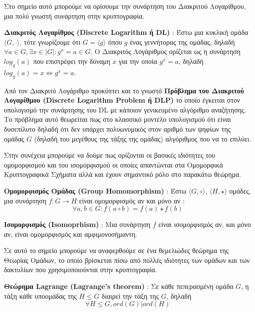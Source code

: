 Στο σημείο αυτό μπορούμε να ορίσουμε την συνάρτηση του Διακριτού Λογαρίθμου, μια πολύ γνωστή συνάρτηση στην κρυπτογραφία.

\begin{definition}
\textbf{Διακριτός Λογαρίθμος (Discrete Logarithm ή DL)} : Έστω μια κυκλική ομάδα $\langle G, \cdot \rangle$, τότε γνωρίζουμε ότι $G = \langle g \rangle$ όπου $g$ ένας γεννήτορας της ομάδας, δηλαδή  $\forall a \in G,  \exists x \in |G|: g^x=a \in G$. Ο Διακριτός Λογάριθμος ορίζεται ως η συνάρτηση $log_g(a)$ που επιστρέφει την δύναμη $x$ για την οποία $g^x=a$, δηλαδή $log_g(a)=x \Leftrightarrow g^x=a$.
\end{definition}

Από τον Διακριτό Λογάριθμο προκύπτει και το γνωστό \textbf{Πρόβλημα του Διακριτού Λογαρίθμου (Discrete Logarithm Problem ή DLP)} το οποίο έγκειται στον υπολογισμό την συνάρτησης του DL με κάποιον γενικευμένο αλγόριθμο αναζήτησης. Το πρόβλημα αυτό θεωρείται πως στο κλασσικό μοντέλο υπολογισμού ότι είναι δυσεπίλυτο δηλαδή ότι δεν υπάρχει πολυωνυμικός στον αριθμό των ψηφίων της ομάδας $G$ (δηλαδή του μεγέθους της τάξης της ομάδας) αλγόριθμος που να το επιλύει.

Στην συνέχεια μπορούμε να δούμε πως ορίζονται οι βασικές ιδιότητες του ομομορφισμού και του ισομορφισμού οι οποίες απαντώνται στα Ομομορφικά Κρυπτογραφικά Σχήματα αλλά και έχουν σημαντικό ρόλο στο παρακάτω θεώρημα.

\begin{definition}
\textbf{Ομομορφισμός Ομάδας (Group Homomorphism)} : Έστω $\langle G, \circ \rangle$, $\langle H, \star \rangle$ ομάδες, μια συνάρτηση $f : G \rightarrow H$ είναι ομομορφισμός αν και μόνο αν :
$$
\forall a, b \in G : f(a \circ b) = f(a) \star f(b)
$$
\end{definition}

\begin{definition}
\textbf{Ισομορφισμός (Isomoprhism)} : Μια συνάρτηση $f$ είναι ισομορφισμός αν, και μόνο αν, είναι ομομορφισμός και αμφιμονοσήμαντη.
\end{definition}

Σε αυτό το σημείο μπορούμε να αναφερθούμε σε ένα θεμελιώδες θεώρημα της Θεωρίας Ομάδων, το οποίο βρίσκεται πίσω από πολλές ιδιότητες των ομάδων και των δακτυλίων που χρησιμοποιούνται στην κρυπτογραφία.

\begin{theorem}
\textbf{Θεώρημα Lagrange (Lagrange's theorem)} :  Σε κάθε πεπερασμένη ομάδα $G$, η τάξη κάθε υποομάδας της $Η \leq G$ διαιρεί την τάξη της $G$, δηλαδή 
$$
\forall H \leq G, ord(G)|ord(H)
$$
\end{theorem}

